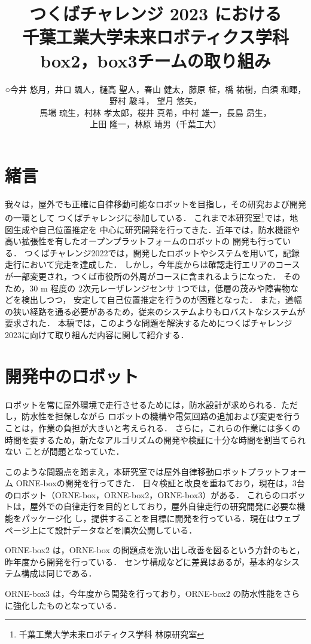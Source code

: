 \documentclass[twocolumn, 9pt]{jsproceedings}
\title{つくばチャレンジ 2023 における\\千葉工業大学未来ロボティクス学科 box2，box3チームの取り組み}
\author{○今井 悠月，井口 颯人，樋高 聖人，春山 健太，藤原 柾，\CID{8705}橋 祐樹，白須 和暉，野村 駿斗，
望月 悠矢，\\馬場 琉生，村林 孝太郎，桜井 真希，中村 雄一，長島 昂生，\\上田 隆一，林原 靖男（千葉工大）}
\affiliation{千葉工業大学未来ロボティクス学科 box2, box3チーム}
\begin{document}
\maketitle

\section{緒言}
我々は，屋外でも正確に自律移動可能なロボットを目指し，その研究および開発の一環として
つくばチャレンジに参加している．
これまで本研究室\footnote{千葉工業大学未来ロボティクス学科 林原研究室}では，地図生成や自己位置推定を
中心に研究開発を行ってきた．近年では，防水機能や高い拡張性を有したオープンプラットフォームのロボットの
開発も行っている．
つくばチャレンジ2022では，開発したロボットやシステムを用いて，記録走行において完走を達成した．
しかし，今年度からは確認走行エリアのコースが一部変更され，つくば市役所の外周がコースに含まれるようになった．
そのため，30 m 程度の 2次元レーザレンジセンサ 1つでは，低層の茂みや障害物などを検出しつつ，
安定して自己位置推定を行うのが困難となった．
また，道幅の狭い経路を通る必要があるため，従来のシステムよりもロバストなシステムが要求された．
本稿では，このような問題を解決するためにつくばチャレンジ2023に向けて取り組んだ内容に関して紹介する．

\section{開発中のロボット}
ロボットを常に屋外環境で走行させるためには，防水設計が求められる．ただし，防水性を担保しながら
ロボットの機構や電気回路の追加および変更を行うことは，作業の負担が大きいと考えられる．
さらに，これらの作業には多くの時間を要するため，新たなアルゴリズムの開発や検証に十分な時間を割当てられない
ことが問題となっていた．

このような問題点を踏まえ，本研究室では屋外自律移動ロボットプラットフォーム ORNE-boxの開発を行ってきた．
日々検証と改良を重ねており，現在は，3台のロボット（ORNE-box，ORNE-box2，ORNE-box3）がある．
これらのロボットは，屋外での自律走行を目的としており，屋外自律走行の研究開発に必要な機能をパッケージ化
し，提供することを目標に開発を行っている．現在はウェブページ上にて設計データなどを順次公開している．

ORNE-box2 は，ORNE-box の問題点を洗い出し改善を図るという方針のもと，昨年度から開発を行っている．
センサ構成などに差異はあるが，基本的なシステム構成は同じである．

ORNE-box3 は，今年度から開発を行っており，ORNE-box2 の防水性能をさらに強化したものとなっている．
\end{document}
